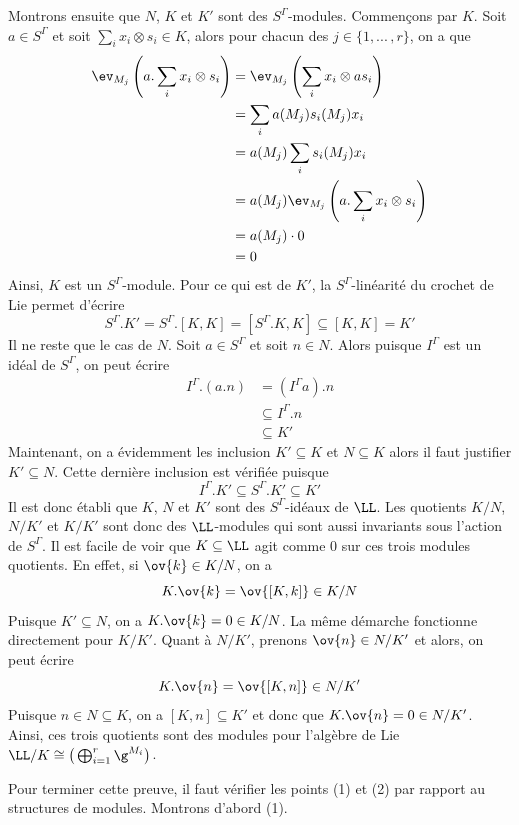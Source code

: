 \begin{Prop}
\begin{pre}
Montrons ensuite que $N$, $K$ et $K'$ sont des $S^\Gamma$-modules. Commençons par $K$. Soit $a \in S^\Gamma$ et soit $\sum_i x_i \otimes s_i \in K$, alors pour chacun des $j \in \{1,...\,,r\}$, on a que
\begin{align*}
\ev_{M_j}\left(a.\sum_i x_i \otimes s_i\right) &= \ev_{M_j}\left(\sum_i x_i \otimes as_i\right)\\
&= \sum_i a(M_j)s_i(M_j)x_i\\
&= a(M_j)\sum_i s_i(M_j)x_i\\
&= a(M_j) \ev_{M_j}\left(a.\sum_i x_i \otimes s_i\right)\\
&= a(M_j) \cdot 0\\
&= 0
\end{align*}
Ainsi, $K$ est un $S^\Gamma$-module. Pour ce qui est de $K'$, la $S^\Gamma$-linéarité du crochet de Lie permet d'écrire 
$$ S^\Gamma.K' = S^\Gamma.[K,K] = [S^\Gamma.K,K] \subseteq [K,K] = K' $$
Il ne reste que le cas de $N$. Soit $a \in S^\Gamma$ et soit $n \in N$. Alors puisque $I^\Gamma$ est un idéal de $S^\Gamma$, on peut écrire
\begin{align*}
I^\Gamma.(a.n) &= (I^\Gamma a).n\\
&\subseteq I^\Gamma.n\\
&\subseteq K'
\end{align*}
Maintenant, on a évidemment les inclusion $K' \subseteq K$ et $N \subseteq K$ alors il faut justifier $K' \subseteq N$. Cette dernière inclusion est vérifiée puisque 
$$ I^\Gamma.K' \subseteq S^\Gamma.K' \subseteq K' $$
Il est donc établi que $K$, $N$ et $K'$ sont des $S^\Gamma$-idéaux de $\LL$. Les quotients $K/N$, $N/K'$ et $K/K'$ sont donc des $\LL$-modules qui sont aussi invariants sous l'action de $S^\Gamma$. Il est facile de voir que $K \subseteq \LL$ agit comme 0 sur ces trois modules quotients. En effet, si $\ov{k} \in K/N$, on a
$$ K.\ov{k} = \ov{[K,k]} \in K/N $$
Puisque $K' \subseteq N$, on a $K.\ov{k} = 0 \in K/N$. La même démarche fonctionne directement pour $K/K'$. Quant à $N/K'$, prenons $\ov{n} \in N/K'$ et alors, on peut écrire
$$ K.\ov{n} = \ov{[K,n]} \in N/K' $$
Puisque $n \in N \subseteq K$, on a $[K,n] \subseteq K'$ et donc que $K.\ov{n} = 0 \in N/K'$. Ainsi, ces trois quotients sont des modules pour l'algèbre de Lie $\LL/K \cong \big(\bigoplus_{i=1}^r \g^{M_i}\big)$.

Pour terminer cette preuve, il faut vérifier les points (1) et (2) par rapport au structures de modules. Montrons d'abord (1).


\end{pre}
\end{Prop}
